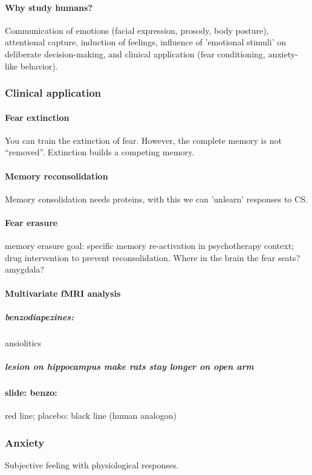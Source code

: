 \documentclass[12pt,article,oneside,a4paper]{memoir}
\begin{document}
\paragraph{Why study humans?}
Communication of emotions (facial expression, prosody, body posture), attentional
capture, induction of feelings, influence of 'emotional stimuli' on deliberate
decision-making, and clinical application (fear conditioning, anxiety-like behavior).

\subsubsection{Clinical application}
\paragraph{Fear extinction}
You can train the extinction of fear. However, the complete memory is not
``removed''. Extinction builds a competing memory.
\paragraph{Memory reconsolidation}
Memory consolidation needs proteins, with this we can 'unlearn' responses to CS.

\paragraph{Fear erasure} memory erasure goal: specific memory re-activation in
psychotherapy context; drug intervention to prevent reconsolidation.  
Where in the brain the fear seats? amygdala?

\paragraph{Multivariate fMRI analysis}
\subparagraph{benzodiapezines:} ansiolitics
\subparagraph{lesion on hippocampus make rats stay longer on open arm}
\paragraph{slide: benzo:} red line; placebo: black line (human analogon)

\subsubsection{Anxiety}
Subjective feeling with physiological responses.

\newpage
\end{document}
